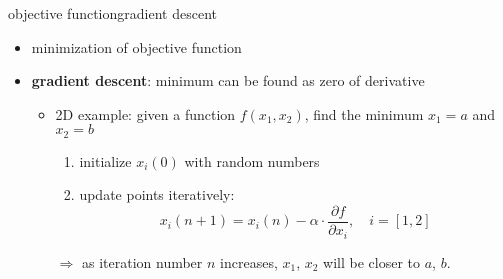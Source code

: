         \begin{frame}{objective function}{gradient descent}
            \begin{itemize}
                \item   minimization of objective function

               \bigskip
            \item<2->  \textbf{gradient descent}: minimum can be found as zero of derivative
                       \begin{itemize}
                            \item  2D example: given a function $f(x_{1}, x_{2})$, find the minimum $x_{1} = a$ and $x_{2} = b$
                                \smallskip
                                \begin{enumerate}
                                    \item  initialize $x_{i}(0)$ with random numbers
                                    \item  update points iteratively:  
                                             \begin{equation*}
                                                 x_{i}(n+1) = x_{i}(n) - \alpha \cdot \frac{\partial f}{\partial x_{i}}, \quad i = [1, 2]
                                             \end{equation*}
                                \end{enumerate}
                            \bigskip
                            \item[$\Rightarrow$] as iteration number $n$ increases, $x_{1}$, $x_{2}$ will be closer to $a$, $b$.
                       \end{itemize}			   			   
            \end{itemize}
        \end{frame}    
          
